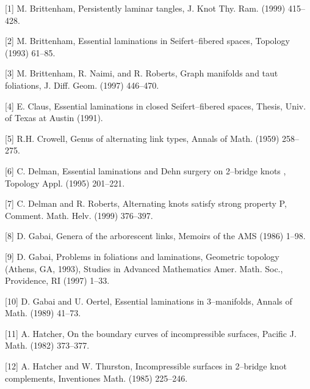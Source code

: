\item{[1]}
M. Brittenham,
{\nineit Persistently laminar tangles},
J. Knot Thy. Ram. 
{}
(1999)
415--428.


\item{[2]}
M. Brittenham,
{\nineit Essential laminations in Seifert--fibered spaces},
Topology
{}
(1993)
61--85.


\item{[3]}
M. Brittenham, R. Naimi, and R. Roberts,
{\nineit Graph manifolds and taut foliations},
J. Diff. Geom.
{}
(1997)
446--470.

\item{[4]}
E. Claus,
{\nineit Essential laminations in closed Seifert--fibered spaces},
Thesis, Univ. of Texas at Austin
(1991).

\item{[5]}
R.H. Crowell,
{\nineit Genus of alternating link types},
Annals of Math.
{}
(1959)
258--275.

\item{[6]}
C. Delman,
{\nineit Essential laminations and Dehn surgery on 2--bridge knots },
Topology Appl.
{}
(1995)
201--221.


\item{[7]}
C. Delman and R. Roberts,
{\nineit Alternating knots satisfy strong property P},
Comment. Math. Helv.
{}
(1999)
376--397.


\item{[8]}
D. Gabai,
{\nineit Genera of the arborescent links},
Memoirs of the AMS
{}
(1986)
1--98.


\item{[9]}
D. Gabai,
{\nineit Problems in foliations and laminations},
Geometric topology (Athens, GA, 1993), Studies in Advanced Mathematics
{}
Amer. Math. Soc., Providence, RI
(1997)
1--33.


\item{[10]}
D. Gabai and U. Oertel,
{\nineit Essential laminations in 3--manifolds},
Annals of Math.
{}
(1989)
41--73.


\item{[11]}
A. Hatcher,
{\nineit On the boundary curves of incompressible surfaces},
Pacific J. Math.
{}
(1982)
373--377.


\item{[12]}
A. Hatcher and W. Thurston,
{\nineit Incompressible surfaces in 2--bridge knot complements},
Inventiones Math. 
{}
(1985)
225--246.


